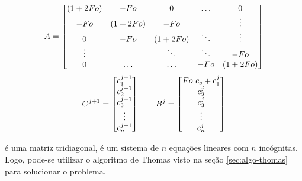\begin{equation*}
	\cmrtext{A} =
	\begin{bmatrix}
		(1+2Fo) & -Fo &   0    &  \ldots   & 0\\
		-Fo & (1+2Fo) &  -Fo   &        & \vdots \\
		 0  & -Fo &   (1+2Fo)   & \ddots & \vdots\\
	 \vdots &     &  \ddots & \ddots & -Fo \\
	     0  & \ldots  &  \ldots &  -Fo   & (1+2Fo) 
	\end{bmatrix}
\end{equation*}
\begin{equation*}
	\cmrtext{C^{j+1}} =
	\begin{bmatrix}
		c_1^{j+1} \\
		c_2^{j+1} \\
		c_3^{j+1} \\
		\vdots \\
		c_n^{j+1}
	\end{bmatrix}
	\qquad
	\cmrtext{B^j} =	
	\begin{bmatrix}
		Fo\ c_s+c_1^j \\
		c_2^{j} \\
		c_3^{j} \\
		\vdots \\
		c_n^{j}
	\end{bmatrix}
\end{equation*}

 é uma matriz tridiagonal,  é um sistema de $n$ equações lineares com $n$ incógnitas. Logo, pode-se utilizar o algoritmo de Thomas visto na seção \ref{sec:algo-thomas} para solucionar o problema.
